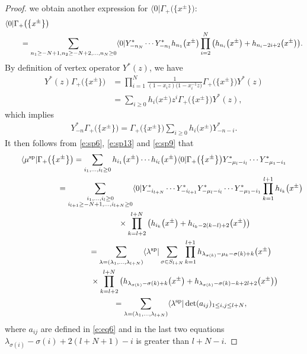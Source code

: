 \documentclass[pdftex]{sigma}
\numberwithin{equation}{section}
\begin{document}
\begin{proof}
we obtain another expression for $\langle 0|\Gamma_+\big(\big\{x^{\pm}\big\}\big)$:
\begin{align}\label{e:sp13}
&\langle 0|\Gamma_+\big(\big\{x^{\pm}\big\}\big)\\
&\qquad=\sum_{n_1\geq -N+1,n_2\geq -N+2,\dots,n_N\geq 0}
\langle 0|Y^*_{-n_N}\cdots Y^*_{-n_1}h_{n_1}\big(x^{\pm}\big)\prod^N_{i=2}\big(h_{n_i}\big(x^{\pm}\big)+h_{n_i-2i+2}\big(x^{\pm}\big)\big).\notag
\end{align}
By definition of vertex operator $Y^*(z)$, we have
\begin{align*}%
 {}Y^*(z)\Gamma_+\big(\big\{x^{\pm}\big\}\big)& =\prod^N_{i=1}\frac{1}{(1-x_iz)\big(1-x^{-1}_iz\big)}\Gamma_+\big(\big\{x^{\pm}\big\}\big)Y^*(z)\\
& =\sum_{i\geq 0}h_i\big(x^{\pm}\big)z^i\Gamma_+\big(\big\{x^{\pm}\big\}\big)Y^*(z),
\end{align*}
which implies
\begin{align*}
Y^*_{-n}\Gamma_+\big(\big\{x^{\pm}\big\}\big) = \Gamma_+\big(\big\{x^{\pm}\big\}\big)\sum_{i\geq 0}h_i\big(x^{\pm}\big)Y^*_{-n-i}.
\end{align*}
It then follows from \eqref{e:sp6}, \eqref{e:sp13} and \eqref{e:sp9} that
\begin{gather}
\notag \langle\mu^{\rm sp}|\Gamma_+\big(\big\{x^{\pm}\big\}\big)=\sum_{i_1,\dots,i_l\geq 0}h_{i_1}\big(x^{\pm}\big)\cdots h_{i_l}\big(x^{\pm}\big)\langle 0|\Gamma_+\big(\big\{x^{\pm}\big\}\big)Y^*_{-\mu_l-i_l}\cdots Y^*_{-\mu_1-i_1}
\\ \notag \hphantom{\langle\mu^{\rm sp}|\Gamma_+\big(\big\{x^{\pm}\big\}\big)}{}
=\sum_{\substack{i_1,\dots,i_l\geq 0\\i_{l+1}\geq -N+1,\dots,i_{l+N}\geq 0}}\langle 0|Y^*_{-i_{l+N}}\cdots Y^*_{-i_{l+1}}Y^*_{-\mu_l-i_l}\cdots Y^*_{-\mu_1-i_1}\prod^{l+1}_{k=1}h_{i_k}\big(x^{\pm}\big)
\\ \notag \hphantom{\langle\mu^{\rm sp}|\Gamma_+\big(\big\{x^{\pm}\big\}\big)=}{}
 \times\prod^{l+N}_{k=l+2}\big(h_{i_k}\big(x^{\pm}\big)+h_{i_k-2(k-l)+2}\big(x^{\pm}\big)\big)
\\ \notag \hphantom{\langle\mu^{\rm sp}|\Gamma_+\big(\big\{x^{\pm}\big\}\big)}{}
=\sum_{\lambda=(\lambda_1,\dots,\lambda_{l+N})}\langle\lambda^{\rm sp}|\sum_{\sigma\in S_{l+N}}
\prod^{l+1}_{k=1}h_{\lambda_{\sigma(k)}-\mu_k-\sigma(k)+k}\big(x^{\pm}\big)
\\ \notag \hphantom{\langle\mu^{\rm sp}|\Gamma_+\big(\big\{x^{\pm}\big\}\big)=}{}
 \times\prod^{l+N}_{k=l+2}\big(h_{\lambda_{\sigma(k)}-\sigma(k)+k}\big(x^{\pm}\big)+h_{\lambda_{\sigma(k)}-\sigma(k)-k+2l+2}\big(x^{\pm}\big)\big)
\\ \hphantom{\langle\mu^{\rm sp}|\Gamma_+\big(\big\{x^{\pm}\big\}\big)}{}
=\sum_{\lambda=(\lambda_1,\dots,\lambda_{l+N})}\langle\lambda^{\rm sp}|\det(a_{ij})_{1\leq i,j\leq l+N},\label{e:sp14}
\end{gather}
where $a_{ij}$ are defined in \eqref{e:eq6} and in the last two equations $\lambda_{\sigma(i)}-\sigma(i)+2(l+N+1)-i$ is greater than $l+N-i$.
\end{proof}
\end{document}
